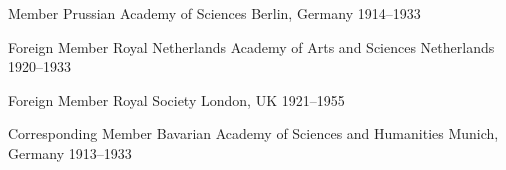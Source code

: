 

\begin{cvhonors}

  \cvhonor
    {Member} %
    {Prussian Academy of Sciences} %
    {Berlin, Germany} %
    {1914--1933} %

    
  \cvhonor
    {Foreign Member} %
    {Royal Netherlands Academy of Arts and Sciences} %
    {Netherlands} %
    {1920--1933} %

    
  \cvhonor
    {Foreign Member} %
    {Royal Society} %
    {London, UK} %
    {1921--1955} %


  \cvhonor
    {Corresponding Member} %
    {Bavarian Academy of Sciences and Humanities} %
    {Munich, Germany} %
    {1913--1933} %

\end{cvhonors}